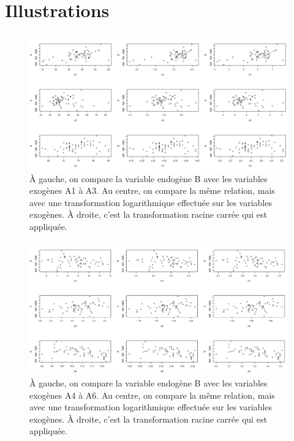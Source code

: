 \documentclass{article}
\begin{document}
	\section{Illustrations}
	\begin{figure}[H]
		\includegraphics[width=\textwidth]{graphiques/Qst1_transformations_1}
		\caption{À gauche, on compare la variable endogène B avec les variables exogènes A1 à A3. Au centre, on compare la même relation, mais avec une transformation logarithmique effectuée sur les variables exogènes. À droite, c'est la transformation racine carrée qui est appliquée.}
		\label{Qst1_transformations_1}
	\end{figure}
	\begin{figure}[H]
		\includegraphics[width=\textwidth]{graphiques/Qst1_transformations_2}
		\caption{À gauche, on compare la variable endogène B avec les variables exogènes A4 à A6. Au centre, on compare la même relation, mais avec une transformation logarithmique effectuée sur les variables exogènes. À droite, c'est la transformation racine carrée qui est appliquée.}
		\label{Qst1_transformations_2}
	\end{figure}
\end{document}
